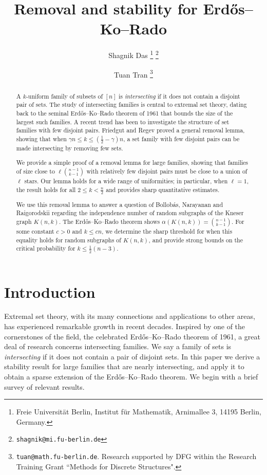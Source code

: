 \documentclass[11pt]{article}
\title{Removal and stability for Erd\H{o}s--Ko--Rado}
\author{
Shagnik Das
\thanks{Freie Universit\"at Berlin, Institut f\"ur Mathematik, Arnimallee 3, 14195 Berlin, Germany.}
\thanks{{\tt shagnik@mi.fu-berlin.de}}
\and
Tuan Tran
\footnotemark[1]
\thanks{{\tt tuan@math.fu-berlin.de}. Research supported by DFG within the Research Training Grant ``Methods for Discrete Structures".}
}
\theoremstyle{definition}
\newcommand{\3}{\bf{3}}
\begin{document}
\maketitle

\begin{abstract}
A $k$-uniform family of subsets of $[n]$ is \emph{intersecting} if it does not contain a disjoint pair of sets.  The study of intersecting families is central to extremal set theory, dating back to the seminal Erd\H{o}s--Ko--Rado theorem of 1961 that bounds the size of the largest such families.  A recent trend has been to investigate the structure of set families with few disjoint pairs.  Friedgut and Regev proved a general removal lemma, showing that when $\gamma n \le k \le (\tfrac12 - \gamma)n$, a set family with few disjoint pairs can be made intersecting by removing few sets.

We provide a simple proof of a removal lemma for large families, showing that families of size close to $\ell \binom{n-1}{k-1}$ with relatively few disjoint pairs must be close to a union of $\ell$ stars.  Our lemma holds for a wide range of uniformities; in particular, when $\ell = 1$, the result holds for all $2 \le k < \frac{n}{2}$ and provides sharp quantitative estimates.

We use this removal lemma to answer a question of Bollob\'as, Narayanan and Raigorodskii regarding the independence number of random subgraphs of the Kneser graph $K(n,k)$.  The Erd\H{o}s--Ko--Rado theorem shows $\alpha(K(n,k)) = \binom{n-1}{k-1}$.  For some constant $c > 0$ and $k \le cn$, we determine the sharp threshold for when this equality holds for random subgraphs of $K(n,k)$, and provide strong bounds on the critical probability for $k \le \tfrac12 (n-3)$.
\end{abstract}

\section{Introduction} \label{sec:intro}

Extremal set theory, with its many connections and applications to other areas, has experienced remarkable growth in recent decades.  Inspired by one of the cornerstones of the field, the celebrated Erd\H{o}s--Ko--Rado theorem of 1961, a great deal of research concerns intersecting families.  We say a family of sets is \emph{intersecting} if it does not contain a pair of disjoint sets.  In this paper we derive a stability result for large families that are nearly intersecting, and apply it to obtain a sparse extension of the Erd\H{o}s--Ko--Rado theorem.  We begin with a brief survey of relevant results.
\end{document}
